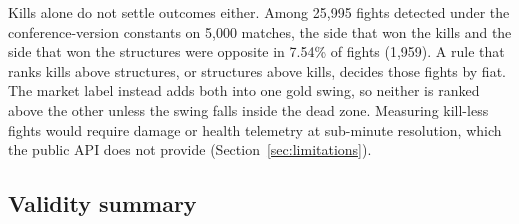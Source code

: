Kills alone do not settle outcomes either. Among 25,995 fights detected under the conference-version
constants on 5,000 matches, the side that won the kills and the side that won the structures were
opposite in 7.54\% of fights (1,959). A rule that ranks kills above structures, or structures above
kills, decides those fights by fiat. The market label instead adds both into one gold swing, so neither
is ranked above the other unless the swing falls inside the dead zone. Measuring kill-less fights would
require damage or health telemetry at sub-minute resolution, which the public API does not provide
(Section~\ref{sec:limitations}).

\subsection{Validity summary}

